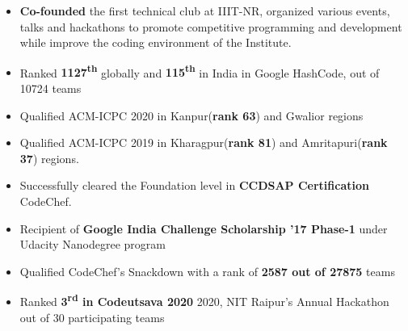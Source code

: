 \documentclass[letterpaper,11pt]{article}
\newcommand{\achievementItem}[1]{
  \item\small{
    {#1 \vspace{-6pt}}
  }
}
\newcommand{\resumeSubHeadingListEnd}{\end{itemize}}
\begin{document}
\begin{itemize}[leftmargin=0.2in]
  \achievementItem{\textbf{Co-founded}  the  first  technical  club  at  IIIT-NR,  organized  various  events, talks and hackathons to  promote competitive programming and development while improve the coding environment of the Institute.}
  \achievementItem{Ranked \textbf{1127\textsuperscript{th}} globally and \textbf{115\textsuperscript{th}} in India in Google HashCode, out of 10724 teams}
  \achievementItem{Qualified ACM-ICPC 2020 in Kanpur(\textbf{rank 63}) and Gwalior regions}
  \achievementItem{Qualified ACM-ICPC 2019 in Kharagpur(\textbf{rank 81}) and Amritapuri(\textbf{rank 37}) regions.}
  \achievementItem{Successfully cleared the Foundation level in \textbf{CCDSAP Certification} CodeChef.}
  \achievementItem{Recipient of {\bf Google India Challenge Scholarship '17 Phase-1} under Udacity Nanodegree program}
  \achievementItem{Qualified CodeChef’s Snackdown with a rank of \textbf{2587 out of 27875}  teams}
  \achievementItem{Ranked {\bf 3\textsuperscript{rd} in Codeutsava 2020} 2020, NIT Raipur’s Annual Hackathon out of 30 participating teams}
\end{itemize}
        
\end{document}
